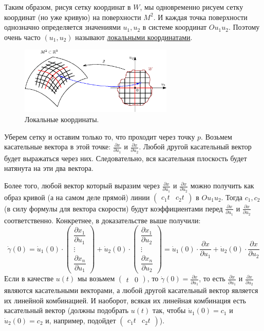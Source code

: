 \documentclass[12pt]{article}
\theoremstyle{definition}
\begin{document}
Таким образом, рисуя сетку координат в $W$, мы одновременно рисуем сетку координат (но уже кривую) на поверхности $M^2$. И каждая точка
поверхности однозначно определяется значениями $u_1, u_2$ в системе координат $Ou_1u_2$. Поэтому очень часто $(u_1,u_2)$ называют \uline{локальными координатами}.
\begin{figure}[H]
	\centering
	\includegraphics[width=0.65\textwidth]{19_11.eps}
	\caption{Локальные координаты.}
	\label{19_11}
\end{figure}
Уберем сетку и оставим только то, что проходит через точку $p$. Возьмем касательные вектора в этой точке: $\tfrac{\partial x}{\partial u_1}$ и $\tfrac{\partial x}{\partial u_2}$. Любой другой касательный вектор будет выражаться через них. Следовательно, вся касательная плоскость будет натянута на эти два вектора. 

Более того, любой вектор который выразим через $\tfrac{\partial x}{\partial u_1}$ и $\tfrac{\partial x}{\partial u_2}$ можно получить как образ кривой (а на самом деле прямой) линии $\begin{pmatrix}
	c_1 t & c_2 t
\end{pmatrix}$ в $Ou_1u_2$. Тогда $c_1,c_2$ (в силу формулы для вектора скорости) будут коэффициентами перед $\tfrac{\partial x}{\partial u_1}$ и $\tfrac{\partial x}{\partial u_2}$ соответственно. Конкретнее, в доказательстве выше получили:
$$
	\dot{\gamma}(0) = \dot{u}_1(0){\cdot}\!\!
	\begin{pmatrix}
		\dfrac{\partial x_1}{\partial u_1}\\
		\vdots\\
		\dfrac{\partial x_n}{\partial u_1}
	\end{pmatrix} + \dot{u}_2(0){\cdot}\!\!
	\begin{pmatrix}
		\dfrac{\partial x_1}{\partial u_2}\\
		\vdots\\
		\dfrac{\partial x_n}{\partial u_2}
	\end{pmatrix} = \dot{u}_1(0){\cdot}\dfrac{\partial x}{\partial u_1} + \dot{u}_2(0){\cdot}\dfrac{\partial x}{\partial u_2}
$$
Если в качестве $u(t)$ мы возьмем $\begin{pmatrix}t & 0 \end{pmatrix}$, то $\dot{\gamma}(0) = \tfrac{\partial x}{\partial u_1}$, то есть $\tfrac{\partial x}{\partial u_1}$ и $\tfrac{\partial x}{\partial u_2}$ являются касательными векторами, а любой другой касательный вектор является их линейной комбинацией. И наоборот, всякая их линейная комбинация есть касательный вектор \big(должны подобрать $u(t)$ так, чтобы $\dot{u}_1(0) = c_1$ и $\dot{u}_2(0) = c_2$ и, например, подойдет $\begin{pmatrix}c_1 t & c_2 t \end{pmatrix}$\big).
\end{document}
